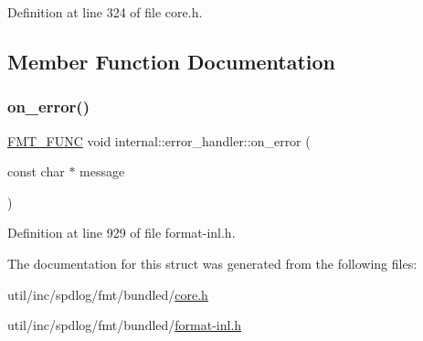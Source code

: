 Definition at line 324 of file core.\+h.



\subsection{Member Function Documentation}
\mbox{\label{structinternal_1_1error__handler_a46e83c008db275b6a59df9c650cec324}} 
\subsubsection{\texorpdfstring{on\+\_\+error()}{on\_error()}}
{\footnotesize\ttfamily \hyperlink{format_8h_a02c8898388e0ae59aab58be14fcd4e05}{F\+M\+T\+\_\+\+F\+U\+NC} void internal\+::error\+\_\+handler\+::on\+\_\+error (\begin{DoxyParamCaption}\item[{const char $\ast$}]{message }\end{DoxyParamCaption})}



Definition at line 929 of file format-\/inl.\+h.



The documentation for this struct was generated from the following files\+:\begin{DoxyCompactItemize}
\item 
util/inc/spdlog/fmt/bundled/\hyperlink{core_8h}{core.\+h}\item 
util/inc/spdlog/fmt/bundled/\hyperlink{format-inl_8h}{format-\/inl.\+h}\end{DoxyCompactItemize}
